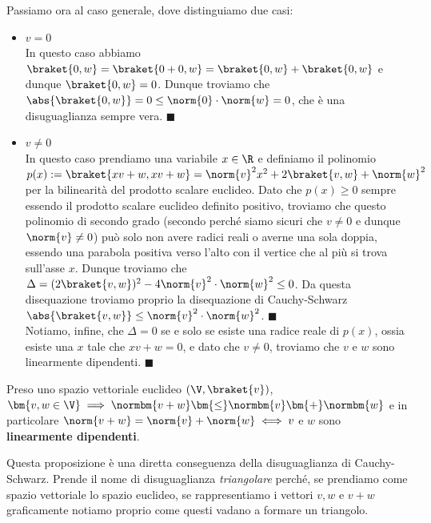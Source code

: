 \documentclass[11pt, a4paper, titlepage, oneside]{scrbook}
\begin{document}
Passiamo ora al caso generale, dove distinguiamo due casi:
\begin{itemize}
    \item $v = 0$ \\
    In questo caso abbiamo $\braket{0,w} = \braket{0 + 0, w} = \braket{0, w} + \braket{0,w}$ e dunque $\braket{0,w} = 0$. Dunque troviamo che $\abs{\braket{0,w}} = 0 \leq \norm{0} \cdot \norm{w} = 0$, che è una disuguaglianza sempre vera. $\blacksquare$
    \item $v \neq 0$ \\
    In questo caso prendiamo una variabile $x \in \R$ e definiamo il polinomio \mbox{$p(x):= \braket{xv + w, xv + w} = \norm{v}^2 x^2 + 2 \braket{v,w} + \norm{w}^2$} per la bilinearità del prodotto scalare euclideo. Dato che $p(x) \geq 0$ sempre essendo il prodotto scalare euclideo definito positivo, troviamo che questo polinomio di secondo grado (secondo perché siamo sicuri che $v \neq 0$ e dunque $\norm{v} \neq 0$) può solo non avere radici reali o averne una sola doppia, essendo una parabola positiva verso l'alto con il vertice che al più si trova sull'asse $x$.
    Dunque troviamo che $\Delta = (2\braket{v,w})^2 - 4 \norm{v}^2 \cdot \norm{w}^2 \leq 0$. Da questa disequazione troviamo proprio la disequazione di Cauchy-Schwarz \mbox{$\abs{\braket{v,w}} \leq \norm{v}^2 \cdot \norm{w}^2$}. $\blacksquare$ \\
    Notiamo, infine, che $\Delta = 0$ se e solo se esiste una radice reale di $p(x)$, ossia esiste una $x$ tale che $xv + w = 0$, e dato che $v \neq 0$, troviamo che $v$ e $w$ sono linearmente dipendenti. $\blacksquare$
\end{itemize}

\begin{Proposizione}
\label{propos-disuguaglianza-triangolare}
Preso uno spazio vettoriale euclideo $(\V, \braket{v})$, $\bm{v,w \in \V} \implies \normbm{v + w} \bm{\leq} \normbm{v} \bm{+} \normbm{w}$ e in particolare $\norm{v + w} = \norm{v} + \norm{w} \iff v$ e $w$ sono \textbf{linearmente dipendenti}.
\end{Proposizione}

\Dimostrazione \nopagebreak

Questa proposizione è una diretta conseguenza della disuguaglianza di Cauchy-Schwarz. Prende il nome di disuguaglianza \textit{triangolare} perché, se prendiamo come spazio vettoriale lo spazio euclideo, se rappresentiamo i vettori $v,w$ e $v + w$ graficamente notiamo proprio come questi vadano a formare un triangolo.
\end{document}

